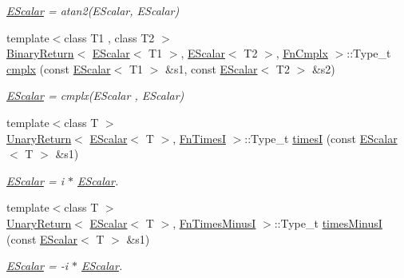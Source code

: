 \begin{DoxyCompactItemize}
\begin{DoxyCompactList}\small\item\em \mbox{\hyperlink{classENSEM_1_1EScalar}{E\+Scalar}} = atan2(\+E\+Scalar, E\+Scalar) \end{DoxyCompactList}\item 
{\footnotesize template$<$class T1 , class T2 $>$ }\\\mbox{\hyperlink{structENSEM_1_1BinaryReturn}{Binary\+Return}}$<$ \mbox{\hyperlink{classENSEM_1_1EScalar}{E\+Scalar}}$<$ T1 $>$, \mbox{\hyperlink{classENSEM_1_1EScalar}{E\+Scalar}}$<$ T2 $>$, \mbox{\hyperlink{structENSEM_1_1FnCmplx}{Fn\+Cmplx}} $>$\+::Type\+\_\+t \mbox{\hyperlink{group__escalar_gaccbb7d66b912e8f0972f4e50095f296e}{cmplx}} (const \mbox{\hyperlink{classENSEM_1_1EScalar}{E\+Scalar}}$<$ T1 $>$ \&s1, const \mbox{\hyperlink{classENSEM_1_1EScalar}{E\+Scalar}}$<$ T2 $>$ \&s2)
\begin{DoxyCompactList}\small\item\em \mbox{\hyperlink{classENSEM_1_1EScalar}{E\+Scalar}} = cmplx(\+E\+Scalar , E\+Scalar) \end{DoxyCompactList}\item 
{\footnotesize template$<$class T $>$ }\\\mbox{\hyperlink{structENSEM_1_1UnaryReturn}{Unary\+Return}}$<$ \mbox{\hyperlink{classENSEM_1_1EScalar}{E\+Scalar}}$<$ T $>$, \mbox{\hyperlink{structENSEM_1_1FnTimesI}{Fn\+TimesI}} $>$\+::Type\+\_\+t \mbox{\hyperlink{group__escalar_gab216ba6f292c204a04e5ff6cd34c32c3}{timesI}} (const \mbox{\hyperlink{classENSEM_1_1EScalar}{E\+Scalar}}$<$ T $>$ \&s1)
\begin{DoxyCompactList}\small\item\em \mbox{\hyperlink{classENSEM_1_1EScalar}{E\+Scalar}} = i $\ast$ \mbox{\hyperlink{classENSEM_1_1EScalar}{E\+Scalar}}. \end{DoxyCompactList}\item 
{\footnotesize template$<$class T $>$ }\\\mbox{\hyperlink{structENSEM_1_1UnaryReturn}{Unary\+Return}}$<$ \mbox{\hyperlink{classENSEM_1_1EScalar}{E\+Scalar}}$<$ T $>$, \mbox{\hyperlink{structENSEM_1_1FnTimesMinusI}{Fn\+Times\+MinusI}} $>$\+::Type\+\_\+t \mbox{\hyperlink{group__escalar_gaf2675acd80a7a861cff22098e403837a}{times\+MinusI}} (const \mbox{\hyperlink{classENSEM_1_1EScalar}{E\+Scalar}}$<$ T $>$ \&s1)
\begin{DoxyCompactList}\small\item\em \mbox{\hyperlink{classENSEM_1_1EScalar}{E\+Scalar}} = -\/i $\ast$ \mbox{\hyperlink{classENSEM_1_1EScalar}{E\+Scalar}}. \end{DoxyCompactList}\item 

\end{DoxyCompactItemize}
